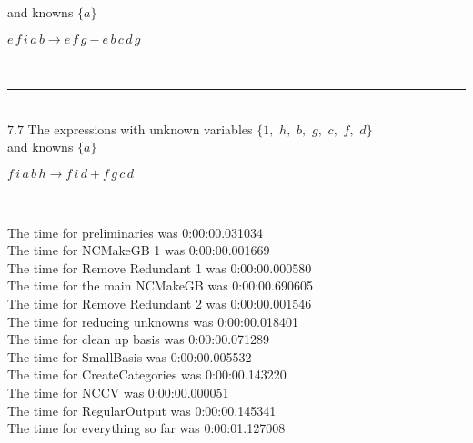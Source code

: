 \documentclass[rep10,leqno]{report}
\begin{document}
and knowns $\{a\}$\smallskip\\
\begin{minipage}{6in}
$
e\,
 f\,
 i\,
 a\,
 b\rightarrow e\,
 f\,
 g - e\,
 b\,
 c\,
 d\,
 g
$
\end{minipage}\\
\rule[3pt]{6in}{.7pt}\\
$7.7$  The expressions with unknown variables $\{1,
$ $
h,
$ $
b,
$ $
g,
$ $
c,
$ $
f,
$ $
d\}$\\
and knowns $\{a\}$\smallskip\\
\begin{minipage}{6in}
$
f\,
 i\,
 a\,
 b\,
 h\rightarrow f\,
 i\,
 d + f\,
 g\,
 c\,
 d
$
\end{minipage}\\
\vspace{10pt}

\noindent
The time for preliminaries was 0:00:00.031034\\
The time for NCMakeGB 1 was 0:00:00.001669\\
The time for Remove Redundant 1 was 0:00:00.000580\\
The time for the main NCMakeGB was 0:00:00.690605\\
The time for Remove Redundant 2 was 0:00:00.001546\\
The time for reducing unknowns was 0:00:00.018401\\
The time for clean up basis was 0:00:00.071289\\
The time for SmallBasis was 0:00:00.005532\\
The time for CreateCategories was 0:00:00.143220\\
The time for NCCV was 0:00:00.000051\\
The time for RegularOutput was 0:00:00.145341\\
The time for everything so far was 0:00:01.127008\\
\end{document}
